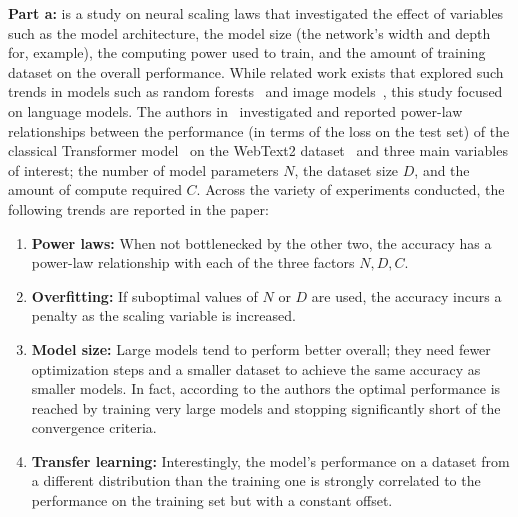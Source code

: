 \documentclass[12pt]{exam}
\begin{document}
\begin{questions}
{\bf Part a:} \citep{kaplan2020scaling} is a study on neural scaling laws that investigated the effect of variables such as the model architecture, the model size (the network's width and depth for, example), the computing power used to train, and the amount of training dataset on the overall performance. While related work exists that explored such trends in models such as random forests~\citep{biau2012analysis} and image models~\citep{tan2019efficientnet}, this study focused on language models. The authors in~\citep{kaplan2020scaling} investigated and reported power-law relationships between the performance (in terms of the loss on the test set) of the classical Transformer model~\citep{vaswani2017attention} on the WebText2 dataset~\citep{radford2019language} and three main variables of interest; the number of model parameters $N$, the dataset size $D$, and the amount of compute required $C$. Across the variety of experiments conducted, the following trends are reported in the paper:
\begin{enumerate}
\item {\bf Power laws:} When not bottlenecked by the other two, the accuracy has a power-law relationship with each of the three factors $N, D, C$.
\item {\bf Overfitting:} If suboptimal values of $N$ or $D$ are used, the accuracy incurs a penalty as the scaling variable is increased.
\item {\bf Model size:} Large models tend to perform better overall; they need fewer optimization steps and a smaller dataset to achieve the same accuracy as smaller models. In fact, according to the authors the optimal performance is reached by training very large models and stopping significantly short of the convergence criteria.
\item {\bf Transfer learning:} Interestingly, the model's performance on a dataset from a different distribution than the training one is strongly correlated to the performance on the training set but with a constant offset.
\end{enumerate}
%

\end{questions}
\end{document}
